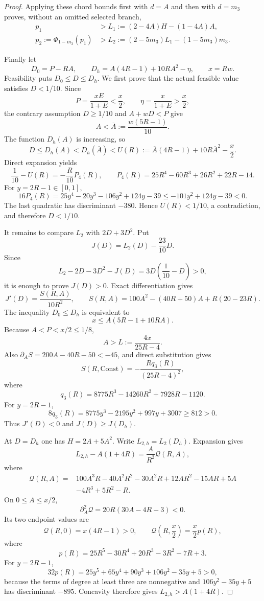 \begin{proof}
Applying these chord bounds first with $d=A$ and then with $d=m_3$ proves,
without an omitted selected branch,
\begin{align*}
 p_1&>L_1:=(2-4A)H-(1-4A)A,\\
 p_2:=\Phi_{1-m_3}(p_1)&>L_2:=(2-5m_3)L_1-(1-5m_3)m_3.
\end{align*}

Finally let
\[
 D_0=P-RA,\qquad
 D_h=A(4R-1)+10RA^2-\eta,\qquad x=Rw.
\]
Feasibility puts $D_0\le D\le D_h$.  We first prove that the actual
feasible value satisfies $D<1/10$.  Since
\[
 P=\frac{xE}{1+E}<\frac x2,\qquad
 \eta=\frac{x}{1+E}>\frac x2,
\]
the contrary assumption $D\ge1/10$ and $A+wD<P$ give
\[
 A<\overline A:=\frac{w(5R-1)}{10}.
\]
The function $D_h(A)$ is increasing, so
\[
 D\le D_h(A)<D_h(\overline A)
 <U(R):=\overline A(4R-1)+10R\overline A^2-\frac x2.
\]
Direct expansion yields
\[
 \frac1{10}-U(R)=-\frac{R}{10}P_4(R),
 \qquad
 P_4(R)=25R^4-60R^3+26R^2+22R-14.
\]
For $y=2R-1\in[0,1]$,
\[
 16P_4(R)=25y^4-20y^3-106y^2+124y-39
 \le-101y^2+124y-39<0.
\]
The last quadratic has discriminant $-380$.  Hence $U(R)<1/10$, a
contradiction, and therefore $D<1/10$.

It remains to compare $L_2$ with $2D+3D^2$.  Put
\[
 J(D)=L_2(D)-\frac{23}{10}D.
\]
Since
\[
 L_2-2D-3D^2-J(D)=3D\left(\frac1{10}-D\right)>0,
\]
it is enough to prove $J(D)>0$.  Exact differentiation gives
\[
 J'(D)=\frac{S(R,A)}{10R^2},\qquad
 S(R,A)=100A^2-(40R+50)A+R(20-23R).
\]
The inequality $D_0\le D_h$ is equivalent to
\[
 x\le A(5R-1+10RA).
\]
Because $A<P<x/2\le1/8$,
\[
 A>L:=\frac{4x}{25R-4}.
\]
Also $\partial_A S=200A-40R-50<-45$, and direct substitution gives
\[
 S(R,\mathrm{Const})=-\frac{R q_3(R)}{(25R-4)^2},
\]
where
\[
 q_3(R)=8775R^3-14260R^2+7928R-1120.
\]
For $y=2R-1$,
\[
 8q_3(R)=8775y^3-2195y^2+997y+3007\ge812>0.
\]
Thus $J'(D)<0$ and $J(D)\ge J(D_h)$.

At $D=D_h$ one has $H=2A+5A^2$.  Write $L_{2,h}=L_2(D_h)$.
Expansion gives
\[
 L_{2,h}-A(1+4R)=\frac{A}{R^2}\mathcal Q(R,A),
\]
where
\[
\begin{aligned}
 \mathcal Q(R,A)={}&100A^3R-40A^2R^2-30A^2R
 +12AR^2-15AR+5A\\
 &-4R^3+5R^2-R.
\end{aligned}
\]
On $0\le A\le x/2$,
\[
 \partial_A^2\mathcal Q=20R(30A-4R-3)<0.
\]
Its two endpoint values are
\[
 \mathcal Q(R,0)=x(4R-1)>0,\qquad
 \mathcal Q\left(R,\frac x2\right)=\frac{x}{2}p(R),
\]
where
\[
 p(R)=25R^5-30R^4+20R^3-3R^2-7R+3.
\]
For $y=2R-1$,
\[
 32p(R)=25y^5+65y^4+90y^3+106y^2-35y+5>0,
\]
because the terms of degree at least three are nonnegative and
$106y^2-35y+5$ has discriminant $-895$.  Concavity therefore gives
$L_{2,h}>A(1+4R)$.


\end{proof}
